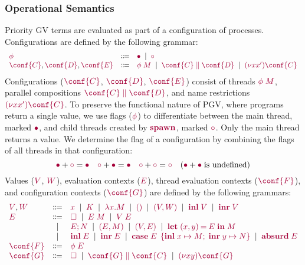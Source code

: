 \documentclass[main.tex]{subfiles}
\begin{document}
\subsubsection*{Operational Semantics}
Priority GV terms are evaluated as part of a configuration of processes. Configurations are defined by the following grammar:
\[
\begin{array}[t]{lcl}
  \tm{\phi}
  & \Coloneqq & \tm{\main}
    \sep        \tm{\child}
  \\
  \tm{\conf{C}}, \tm{\conf{D}}, \tm{\conf{E}}
  & \Coloneqq & \tm{\phi\;M}
    \sep        \tm{\ppar{\conf{C}}{\conf{D}}}
    \sep        \tm{\res{x}{x'}{\conf{C}}}
\end{array}
\]
Configurations ($\tm{\conf{C}}$, $\tm{\conf{D}}$, $\tm{\conf{E}}$) consist of threads $\tm{\phi\;M}$, parallel compositions $\tm{\ppar{\conf{C}}{\conf{D}}}$, and name restrictions $\tm{\res{x}{x'}{\conf{C}}}$. To preserve the functional nature of PGV, where programs return a single value, we use flags ($\tm{\phi}$) to differentiate between the main thread, marked $\tm{\main}$, and child threads created by $\tm{\spawn}$, marked $\tm{\child}$. Only the main thread returns a value. We determine the flag of a configuration by combining the flags of all threads in that configuration:
\[
  \tm{\main}  + \tm{\child} = \tm{\main}
  \quad
  \tm{\child} + \tm{\main}  = \tm{\main}
  \quad
  \tm{\child} + \tm{\child} = \tm{\child}
  \quad
  (\tm{\main}  + \tm{\main} \; \text{is undefined})
\]
Values ($\tm{V}$, $\tm{W}$), evaluation contexts ($\tm{E}$), thread evaluation contexts ($\tm{\conf{F}}$), and configuration contexts ($\tm{\conf{G}}$) are defined by the following grammars:
\[
\begin{array}[t]{lcl}
  \tm{V}, \tm{W}
  & \Coloneqq & \tm{x}
    \sep        \tm{K}
    \sep        \tm{\lambda x.M}
    \sep        \tm{\unit}
    \sep        \tm{\pair{V}{W}}
    \sep        \tm{\inl{V}}
    \sep        \tm{\inr{V}} \\
  \tm{E}
  & \Coloneqq & \tm{\hole}
    \sep        \tm{E\;M}
    \sep        \tm{V\;E} \\
  & \sep      & \tm{\andthen{E}{N}}
    \sep        \tm{\pair{E}{M}}
    \sep        \tm{\pair{V}{E}}
    \sep        \tm{\letpair{x}{y}{E}{M}} \\
  & \sep      & \tm{\inl{E}}
    \sep        \tm{\inr{E}}
    \sep        \tm{\casesum{E}{x}{M}{y}{N}}
    \sep        \tm{\absurd{E}} \\
  \tm{\conf{F}}
  & \Coloneqq & \tm{\phi\;E}
  \\
  \tm{\conf{G}}
  & \Coloneqq & \tm{\hole}
    \sep        \tm{\ppar{\conf{G}}{\conf{C}}}
    \sep        \tm{\res{x}{y}{\conf{G}}}
\end{array}
\]
\end{document}
